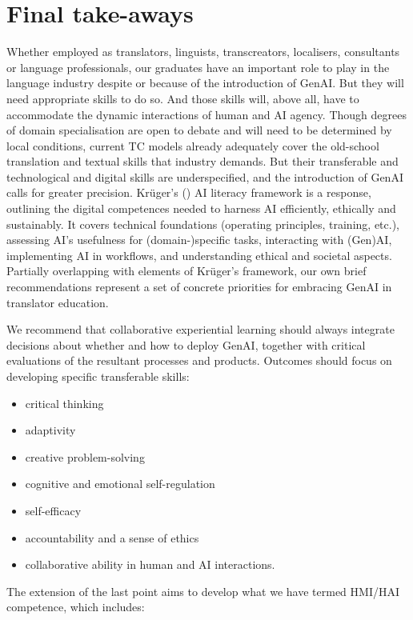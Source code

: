\documentclass[output=paper]{langscibook}
\begin{document}
\section{Final take-aways}
\largerpage
Whether employed as translators, linguists, transcreators, localisers, consultants or language professionals, our graduates have an important role to play in the language industry despite or because of the introduction of GenAI. But they will need appropriate skills to do so. And those skills will, above all, have to accommodate the dynamic interactions of human and AI agency. Though degrees of domain specialisation are open to debate and will need to be determined by local conditions, current TC models already adequately cover the old-school translation and textual skills that industry demands. But their transferable and technological and digital skills are underspecified, and the introduction of GenAI calls for greater precision. Krüger’s (\citeyear{kruger24_AI_literacy_framework}) AI literacy framework is a response, outlining the digital competences needed to harness AI efficiently, ethically and sustainably. It covers technical foundations (operating principles, training,  etc.), assessing AI’s usefulness for (domain-)specific tasks, interacting with (Gen)AI, implementing AI in workflows, and understanding ethical and societal aspects. Partially overlapping with elements of Krüger’s framework, our own brief recommendations represent a set of concrete priorities for embracing GenAI in translator education. 

We recommend that collaborative experiential learning should always integrate decisions about whether and how to deploy GenAI, together with critical evaluations of the resultant processes and products. Outcomes should focus on developing specific transferable skills:

\begin{itemize}
\item critical thinking
\item adaptivity
\item creative problem-solving
\item cognitive and emotional self-regulation
\item self-efficacy
\item accountability and a sense of ethics 
\item collaborative ability in human and AI interactions.
\end{itemize}

The extension of the last point aims to develop what we have termed HMI/HAI competence, which includes:
\end{document}

